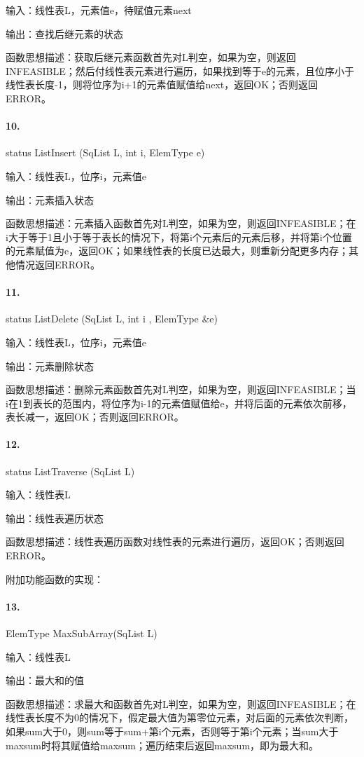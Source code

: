 \documentclass[supercite]{Experimental_Report}
\theoremstyle{definition}
\begin{document}
输入：线性表L，元素值e，待赋值元素next

输出：查找后继元素的状态

函数思想描述：获取后继元素函数首先对L判空，如果为空，则返回INFEASIBLE；然后付线性表元素进行遍历，如果找到等于e的元素，且位序小于线性表长度-1，则将位序为i+1的元素值赋值给next，返回OK；否则返回ERROR。

\paragraph{10.}status ListInsert (SqList L, int i, ElemType e)

输入：线性表L，位序i，元素值e

输出：元素插入状态

函数思想描述：元素插入函数首先对L判空，如果为空，则返回INFEASIBLE；在i大于等于1且小于等于表长的情况下，将第i个元素后的元素后移，并将第i个位置的元素赋值为e，返回OK；如果线性表的长度已达最大，则重新分配更多内存；其他情况返回ERROR。

\paragraph{11.}status ListDelete (SqList L, int i , ElemType \&e)

输入：线性表L，位序i，元素值e

输出：元素删除状态

函数思想描述：删除元素函数首先对L判空，如果为空，则返回INFEASIBLE；当i在1到表长的范围内，将位序为i-1的元素值赋值给e，并将后面的元素依次前移，表长减一，返回OK；否则返回ERROR。

\paragraph{12.}status ListTraverse (SqList L)

输入：线性表L

输出：线性表遍历状态

函数思想描述：线性表遍历函数对线性表的元素进行遍历，返回OK；否则返回ERROR。

附加功能函数的实现：

\paragraph{13.}ElemType MaxSubArray(SqList L)

输入：线性表L

输出：最大和的值

函数思想描述：求最大和函数首先对L判空，如果为空，则返回INFEASIBLE；在线性表长度不为0的情况下，假定最大值为第零位元素，对后面的元素依次判断，如果sum大于0，则sum等于sum+第i个元素，否则等于第i个元素；当sum大于maxsum时将其赋值给maxsum；遍历结束后返回maxsum，即为最大和。
\end{document}

